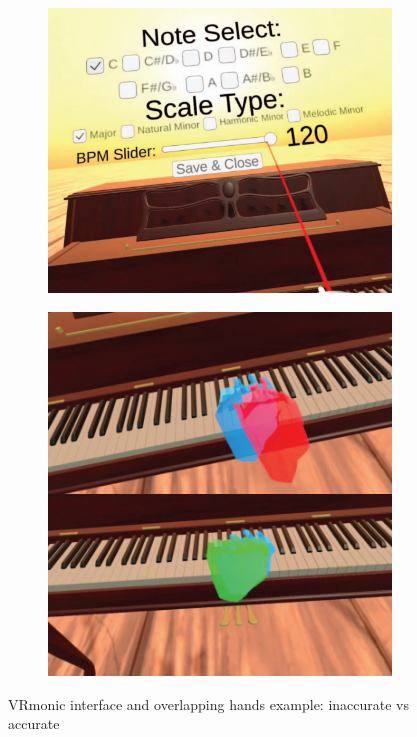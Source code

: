 \begin{figure}[ht]
	\centering
	\begin{subfigure}{0.55\textwidth}
		\centering
		\includegraphics[width=\textwidth]{images/related-work/vrmonic}
	\end{subfigure}
	\hfill
	\begin{subfigure}{0.43\textwidth}
		\centering
		\includegraphics[width=\textwidth]{images/related-work/vrmonic-example}
	\end{subfigure}
	\caption{VRmonic interface and overlapping hands example: inaccurate vs accurate}
	\label{fig:vrmonic}
\end{figure}
